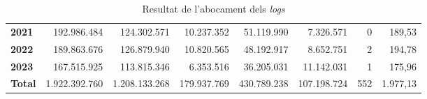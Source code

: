 \begin{table}[h!]
\begin{adjustbox}{width=1.5\textwidth, center}
\begin{tabular}{|l|r|r|r|r|r|r|r|}
        \textbf{2021}       & 192.986.484           & 124.302.571           & 10.237.352                & 51.119.990            & 7.326.571                 & 0             & 189,53        \\
        \textbf{2022}       & 189.863.676           & 126.879.940           & 10.820.565                & 48.192.917            & 8.652.751                 & 2             & 194,78        \\
        \textbf{2023}       & 167.515.925           & 113.815.346           & 6.353.516                 & 36.205.031            & 11.142.031                & 1             & 175,96        \\
        \midrule
        \textbf{Total}      & 1.922.392.760         & 1.208.133.268         & 179.937.769               & 430.789.238           & 107.198.724               & 552           & 1.977,13      \\
        \bottomrule
    \end{tabular}
    \end{adjustbox}
    \caption{Resultat de l'abocament dels \textit{logs}}
    \label{tab:logs-table}
\end{table}

\clearpage

